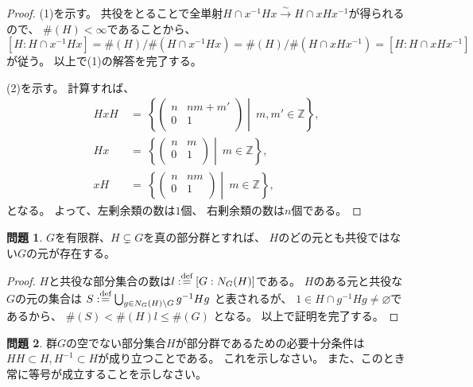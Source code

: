 \documentclass[uplatex]{jsreport}
\theoremstyle{definition}
\newtheorem{prob}[prob]{問題}
\renewcommand{\emptyset}{\varnothing}
\newcommand{\dfn}{:\overset{\mbox{{\scriptsize def}}}{=}}
\newcommand{\Z}{\mathbb{Z}}
\begin{document}
\begin{proof}
  (1)を示す。
  共役をとることで全単射\(H\cap x^{-1}Hx \xrightarrow{\sim} H\cap xHx^{-1}\)が得られるので、
  \(\#(H) < \infty\)であることから、
  \[
  [H:H\cap x^{-1}Hx] = \#(H)/\#(H\cap x^{-1}Hx)
  = \#(H)/\#(H\cap xHx^{-1}) = [H:H\cap xHx^{-1}]
  \]
  が従う。
  以上で(1)の解答を完了する。

  (2)を示す。
  計算すれば、
  \begin{align*}
    HxH \ &= \ \left\{
    \begin{pmatrix}
      n & nm+m' \\
      0 & 1 \\
    \end{pmatrix}
    \middle| \ m,m'\in \Z
    \right\}, \\
    Hx \ &= \ \left\{
    \begin{pmatrix}
      n & m \\
      0 & 1 \\
    \end{pmatrix}
    \middle| \ m\in \Z
    \right\}, \\
    xH \ &= \ \left\{
    \begin{pmatrix}
      n & nm \\
      0 & 1 \\
    \end{pmatrix}
    \middle| \ m\in \Z
    \right\},
  \end{align*}
  となる。
  よって、左剰余類の数は\(1\)個、
  右剰余類の数は\(n\)個である。
\end{proof}



\begin{prob}
  \(G\)を有限群、\(H\subsetneq G\)を真の部分群とすれば、
  \(H\)のどの元とも共役ではない\(G\)の元が存在する。
\end{prob}


\begin{proof}
  \(H\)と共役な部分集合の数は\(l \dfn [G:N_G(H)]\)である。
  \(H\)のある元と共役な\(G\)の元の集合は
  \(S\dfn \bigcup_{g\in N_G(H)\backslash G} g^{-1}Hg\)
  と表されるが、
  \(1\in H\cap g^{-1}Hg\neq \emptyset\)であるから、
  \(\#(S) < \#(H)l \leq \#(G)\)
  となる。
  以上で証明を完了する。
\end{proof}





\begin{prob}
  群\(G\)の空でない部分集合\(H\)が部分群であるための必要十分条件は
  \(HH\subset H, H^{-1}\subset H\)が成り立つことである。
  これを示しなさい。
  また、このとき常に等号が成立することを示しなさい。
\end{prob}
\end{document}
